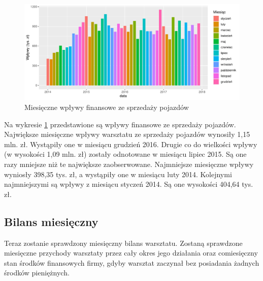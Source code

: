 \documentclass{article}\usepackage[]{graphicx}\usepackage[]{xcolor}
\makeatletter
\def\maxwidth{ %
  \ifdim\Gin@nat@width>\linewidth
    \linewidth
  \else
    \Gin@nat@width
  \fi
}
\newenvironment{knitrout}{}{} %
\makeatother
\begin{document}
\begin{knitrout}
\color{fgcolor}\begin{figure}[H]

{\centering \includegraphics[width=\maxwidth]{figure/fig_samochody_wplywy-1} 

}

\caption[Miesięczne wpływy finansowe ze sprzedaży pojazdów]{Miesięczne wpływy finansowe ze sprzedaży pojazdów}\label{fig:fig_samochody_wplywy}
\end{figure}

\end{knitrout}

Na wykresie \ref{fig:fig_samochody_wplywy} przedstawione są wpływy finansowe ze sprzedaży pojazdów. 
Największe miesięczne wpływy warsztatu ze sprzedaży pojazdów wynosiły 1,15 mln. zł. Wystąpiły one w miesiącu grudzień 2016. 
Drugie co do wielkości wpływy (w wysokości 1,09 mln. zł) zostały odnotowane w miesiącu lipiec 2015. Są one  razy mniejsze niż te największe zaobserwowane.
Najmniejsze miesięczne wpływy wyniosły 398,35 tys. zł, a wystąpiły one w miesiącu luty 2014.
Kolejnymi najmniejszymi są wpływy z miesiącu styczeń 2014. Są one wysokości 404,64 tys. zł.


\subsection{Bilans miesięczny}

Teraz zostanie sprawdzony miesięczny bilans warsztatu. Zostaną sprawdzone miesięczne przychody warsztaty przez cały okres jego działania oraz comiesięczny stan środków finansowych firmy, gdyby warsztat zaczynał bez posiadania żadnych środków pieniężnych.
\end{document}
